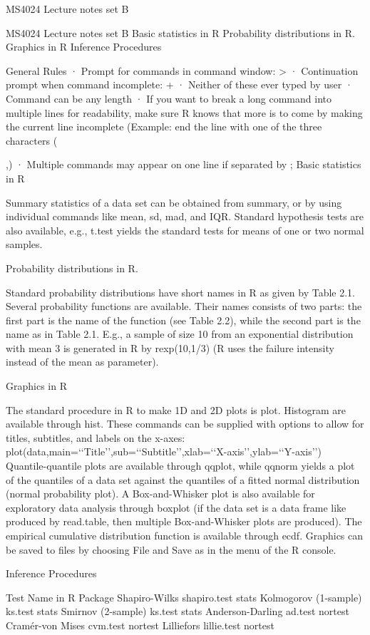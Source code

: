 MS4024 Lecture notes set B

MS4024 Lecture notes set B
Basic statistics in R
Probability distributions in R.
Graphics in R
Inference Procedures
 
General Rules
· Prompt for commands in command window: >
· Continuation prompt when command incomplete: +
· Neither of these ever typed by user
· Command can be any length
· If you want to break a long command into multiple lines for readability, make sure R knows that more is to come by making the current line incomplete (Example: end the line with one of the three characters ({,)
· Multiple commands may appear on one line if separated by ;
Basic statistics in R

Summary statistics of a data set can be obtained from summary, or by using individual commands
like mean, sd, mad, and IQR. Standard hypothesis tests are also available, e.g., t.test
yields the standard tests for means of one or two normal samples. 
 
Probability distributions in R.

Standard probability distributions have short names in R as given by Table 2.1. Several
probability functions are available. Their names consists of two parts: the first part is the
name of the function (see Table 2.2), while the second part is the name as in Table 2.1.
E.g., a sample of size 10 from an exponential distribution with mean 3 is generated in R by
rexp(10,1/3) (R uses the failure intensity instead of the mean as parameter).

Graphics in R

The standard procedure in R to make 1D and 2D plots is plot. Histogram are available
through hist. These commands can be supplied with options to allow for titles, subtitles,
and labels on the x-axes:
plot(data,main=‘‘Title’’,sub=‘‘Subtitle’’,xlab=‘‘X-axis’’,ylab=‘‘Y-axis’’)
Quantile-quantile plots are available through qqplot, while qqnorm yields a plot of the quantiles
of a data set against the quantiles of a fitted normal distribution (normal probability plot).
A Box-and-Whisker plot is also available for exploratory data analysis through boxplot (if
the data set is a data frame like produced by read.table, then multiple Box-and-Whisker
plots are produced). The empirical cumulative distribution function is available through ecdf.
Graphics can be saved to files by choosing File and Save as in the menu of the R console. 
 
Inference Procedures
 
Test
Name in R
Package
Shapiro-Wilks
shapiro.test
stats
Kolmogorov (1-sample)
ks.test
stats
Smirnov (2-sample)
ks.test
stats
Anderson-Darling
ad.test
nortest
Cramér-von Mises
cvm.test
nortest
Lilliefors
lillie.test
nortest

}

